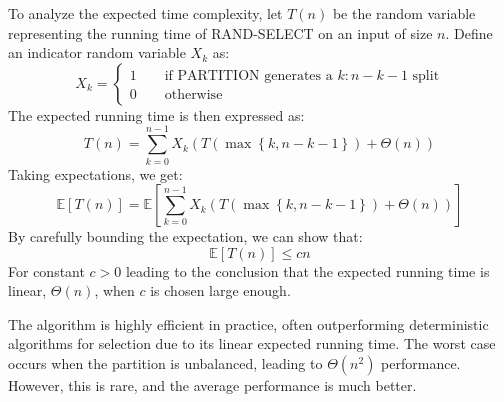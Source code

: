 To analyze the expected time complexity, let $T(n)$ be the random variable representing the running time of RAND-SELECT on an input of size $n$. 
Define an indicator random variable $X_k$ as: 
\[X_k=\begin{cases}  1 \qquad \text{if PARTITION generates a } k : n-k-1\text{ split} \\ 0 \qquad\text{otherwise} \end{cases}\]
The expected running time is then expressed as:
\[T(n)=\sum_{k=0}^{n-1}X_k\left(T\left(\max\left\{k, n - k -1\right\}\right)+\Theta(n)\right)\]
Taking expectations, we get:
\[\mathbb{E}[T(n)]=\mathbb{E}\left[\sum_{k=0}^{n-1}X_k\left(T\left(\max\left\{k, n - k -1\right\}\right)+\Theta(n)\right)\right]\]
By carefully bounding the expectation, we can show that: 
\[\mathbb{E}[T(n)] \leq c n\]  
For constant $c > 0$ leading to the conclusion that the expected running time is linear, $\Theta(n)$, when $c$ is chosen large enough.

The algorithm is highly efficient in practice, often outperforming deterministic algorithms for selection due to its linear expected running time.
The worst case occurs when the partition is unbalanced, leading to $\Theta(n^2)$ performance. 
However, this is rare, and the average performance is much better.

